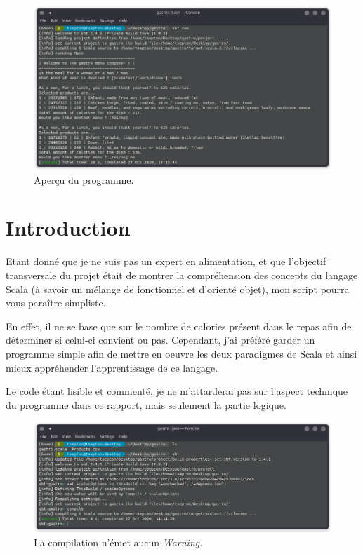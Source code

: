 \vfill
\begin{figure}[H]
    \centering
    \includegraphics[width=1\textwidth]{parts/pics/2.png}
    \caption{Aperçu du programme.}
    \label{fig:my_label}
\end{figure}

\newpage
\section{Introduction}
Etant donné que je ne suis pas un expert en alimentation, et que l'objectif transversale du projet était de montrer la compréhension des concepts du langage Scala (à savoir un mélange de fonctionnel et d'orienté objet), mon script pourra vous paraître simpliste. 

En effet, il ne se base que sur le nombre de calories présent dans le repas afin de déterminer si celui-ci convient ou pas. Cependant, j'ai préféré garder un programme simple afin de mettre en oeuvre les deux paradigmes de Scala et ainsi mieux appréhender l'apprentissage de ce langage. 

Le code étant lisible et commenté, je ne m'attarderai pas sur l'aspect technique du programme dans ce rapport, mais seulement la partie logique.

\begin{figure}[H]
    \centering
    \includegraphics[width=1\textwidth]{parts/pics/1.png}
    \caption{La compilation n'émet aucun \textit{Warning}.}
    \label{fig:my_label}
\end{figure}
